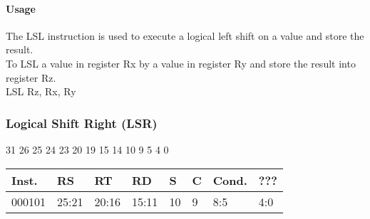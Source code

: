 \documentclass[12pt]{article}
\begin{document}
    \paragraph{Usage}
    \begin{flushleft}
    The LSL instruction is used to execute a logical left shift on a value and store the result.\\
    \vspace{1em}
    To LSL a value in register Rx by a value in register Ry and store the result into register Rz.\\
    \vspace{1em}
    LSL Rz, Rx, Ry
    \end{flushleft}
   
   




    \newpage
    \subsubsection{Logical Shift Right (LSR)}
    
    \hspace{1.6cm}31 \hspace{1.2cm}26 \hspace{.075cm}25 \hspace{.15cm}24 \hspace{.075cm}23 \hspace{.875cm}20 \hspace{.04cm}19 \hspace{.8cm}15 \hspace{.04cm}14 \hspace{.8cm}10 \hspace{.04cm}9 \hspace{1.15cm}5 \hspace{.04cm}4 \hspace{1.25cm}0
    \vspace{-.25cm}
    \begin{center}
        \begin{tabular}{ |p{1.8cm}|p{1.5cm}|p{1.5cm}|p{1.5cm}|p{0.3cm}|p{0.3cm}|p{1.5cm}|p{1.5cm}| }
            \hline
            \textbf{Inst.} & \textbf{RS}& \textbf{RT} & \textbf{RD} & \textbf{S} & \textbf{C} & \textbf{Cond.} & ???\\
            \hline
            000101& 25:21 & 20:16 & 15:11 & 10 & 9 & 8:5 &4:0\\
            \hline
        \end{tabular}
    \end{center}
    
\end{document}
